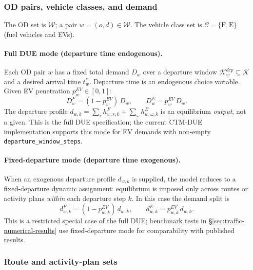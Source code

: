 \subsubsection{OD pairs, vehicle classes, and demand}
\label{sec:traffic-demand}

The OD set is $\mathcal{W}$; a pair $w = (o, d) \in \mathcal{W}$.
The vehicle class set is $\mathcal{C} = \{\mathrm{F}, \mathrm{E}\}$
(fuel vehicles and EVs).

\paragraph{Full DUE mode (departure time endogenous).}
Each OD pair $w$ has a fixed total demand $D_w$ over a departure window
$\mathcal{K}^{dep}_w \subseteq \mathcal{K}$ and a desired arrival time
$t^*_w$.  Departure time is an endogenous choice variable.  Given EV
penetration $p^{EV}_w \in [0,1]$:
\begin{equation}
  D^F_w = (1 - p^{EV}_w)\,D_w, \qquad
  D^E_w = p^{EV}_w\,D_w.
  \label{eq:demand-total}
\end{equation}
The departure profile $d_{w,k} = \sum_r h^F_{w,r,k} + \sum_\omega h^E_{w,\omega,k}$
is an equilibrium \emph{output}, not a given.  This is the full DUE
specification; the current CTM-DUE implementation supports this mode for
EV demands with non-empty \texttt{departure\_window\_steps}.

\paragraph{Fixed-departure mode (departure time exogenous).}
When an exogenous departure profile $d_{w,k}$ is supplied, the model
reduces to a fixed-departure dynamic assignment: equilibrium is imposed
only across routes or activity plans \emph{within} each departure step
$k$.  In this case the demand split is
\begin{equation}
  d^F_{w,k} = (1 - p^{EV}_{w,k})\,d_{w,k}, \qquad
  d^E_{w,k} = p^{EV}_{w,k}\,d_{w,k}.
  \label{eq:demand-split}
\end{equation}
This is a restricted special case of the full DUE; benchmark tests in
\S\ref{sec:traffic-numerical-results} use fixed-departure mode for
comparability with published results.

\subsubsection{Route and activity-plan sets}

